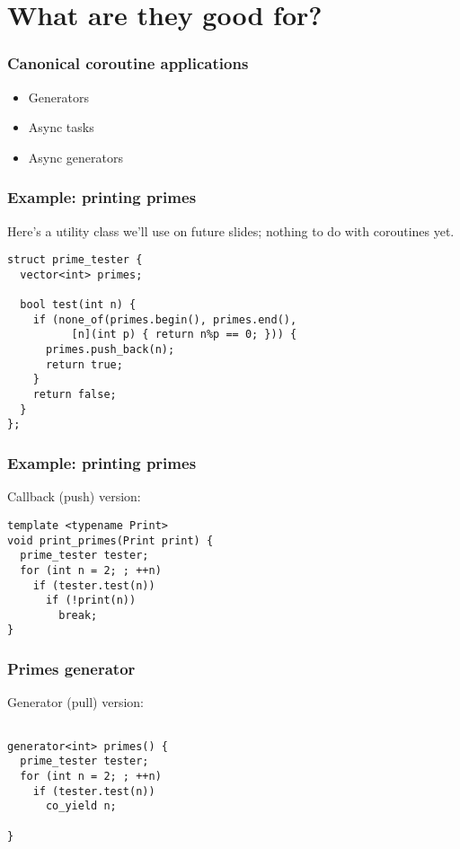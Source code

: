 \documentclass[aspectratio=43]{beamer}
\begin{document}

\section{What are they good for?}

\begin{frame}
  \frametitle{Canonical coroutine applications}
  \begin{itemize}
  \item Generators
  \item Async tasks
  \item Async generators
  \end{itemize}
\end{frame}

\begin{frame}[fragile]
  \frametitle{Example: printing primes}
  Here's a utility class we'll use on future slides; nothing to do with
  coroutines yet.
\begin{lstlisting}
struct prime_tester {
  vector<int> primes;

  bool test(int n) {
    if (none_of(primes.begin(), primes.end(),
          [n](int p) { return n%p == 0; })) {
      primes.push_back(n);
      return true;
    }
    return false;
  }
};
\end{lstlisting}
\end{frame}

\begin{frame}[fragile]
  \frametitle{Example: printing primes}
  Callback (push) version:
  \begin{lstlisting}
template <typename Print>
void print_primes(Print print) {
  prime_tester tester;
  for (int n = 2; ; ++n)
    if (tester.test(n))
      if (!print(n))
        break;
}
\end{lstlisting}
\end{frame}
\begin{frame}[fragile]
  \frametitle{Primes generator}
  Generator (pull) version:
  \begin{lstlisting}

generator<int> primes() {
  prime_tester tester;
  for (int n = 2; ; ++n)
    if (tester.test(n))
      co_yield n;

}
\end{lstlisting}
\end{frame}
\end{document}
